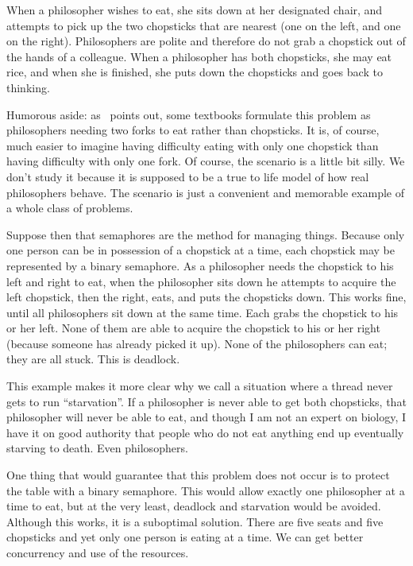 When a philosopher wishes to eat, she sits down at her designated chair, and attempts to pick up the two chopsticks that are nearest (one on the left, and one on the right). Philosophers are polite and therefore do not grab a chopstick out of the hands of a colleague. When a philosopher has both chopsticks, she may eat rice, and when she is finished, she puts down the chopsticks and goes back to thinking.

Humorous aside: as~\cite{mte241} points out, some textbooks formulate this problem as philosophers needing two forks to eat rather than chopsticks. It is, of course, much easier to imagine having difficulty eating with only one chopstick than having difficulty with only one fork. Of course, the scenario is a little bit silly. We don't study it because it is supposed to be a true to life model of how real philosophers behave. The scenario is just a convenient and memorable example of a whole class of problems.

Suppose then that semaphores are the method for managing things. Because only one person can be in possession of a chopstick at a time, each chopstick may be represented by a binary semaphore. As a philosopher needs the chopstick to his left and right to eat, when the philosopher sits down he attempts to acquire the left chopstick, then the right, eats, and puts the chopsticks down. This works fine, until all philosophers sit down at the same time. Each grabs the chopstick to his or her left. None of them are able to acquire the chopstick to his or her right (because someone has already picked it up). None of the philosophers can eat; they are all stuck. This is deadlock. 

This example makes it more clear why we call a situation where a thread never gets to run ``starvation''. If a philosopher is never able to get both chopsticks, that philosopher will never be able to eat, and though I am not an expert on biology, I have it on good authority that people who do not eat anything end up eventually starving to death. Even philosophers.

One thing that would guarantee that this problem does not occur is to protect the table with a binary semaphore. This would allow exactly one philosopher at a time to eat, but at the very least, deadlock and starvation would be avoided. Although this works, it is a suboptimal solution. There are five seats and five chopsticks and yet only one person is eating at a time. We can get better concurrency and use of the resources.

